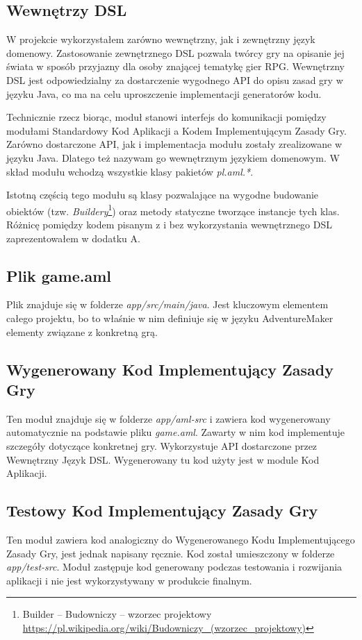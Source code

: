 \documentclass[openright]{xmgr}
\begin{document}
\subsection*{Wewnętrzy DSL}

W projekcie wykorzystałem zarówno wewnętrzny, jak i zewnętrzny język domenowy. Zastosowanie zewnętrznego DSL pozwala twórcy gry na opisanie jej świata w sposób przyjazny dla osoby znającej tematykę gier RPG.  Wewnętrzny DSL jest odpowiedzialny za dostarczenie wygodnego API do opisu zasad gry w języku Java, co ma na celu uproszczenie implementacji generatorów kodu.

Technicznie rzecz biorąc, moduł stanowi interfejs do komunikacji pomiędzy modułami Standardowy Kod Aplikacji a Kodem Implementującym Zasady Gry. Zarówno dostarczone API, jak i implementacja modułu zostały zrealizowane w języku Java. Dlatego też nazywam go wewnętrznym językiem domenowym. W skład modułu wchodzą wszystkie klasy pakietów \textit{pl.aml.*}.

Istotną częścią tego modułu są klasy pozwalające na wygodne budowanie obiektów (tzw. \textit{Buildery}\footnote{Builder -- Budowniczy  -- wzorzec projektowy  \url{https://pl.wikipedia.org/wiki/Budowniczy_(wzorzec_projektowy)}}) oraz metody statyczne tworzące instancje tych klas. Różnicę pomiędzy kodem pisanym z i bez wykorzystania wewnętrznego DSL zaprezentowałem w dodatku A.

\subsection*{Plik game.aml}
Plik znajduje się w folderze \textit{app/src/main/java}. Jest kluczowym elementem całego projektu, bo to właśnie w nim definiuje się w języku AdventureMaker elementy związane z konkretną grą.

\subsection*{Wygenerowany Kod Implementujący Zasady Gry}
Ten moduł znajduje się w folderze \textit{app/aml-src} i zawiera kod wygenerowany automatycznie na podstawie pliku \textit{game.aml}. Zawarty w nim kod implementuje szczegóły dotyczące konkretnej gry. Wykorzystuje API dostarczone przez Wewnętrzny Język DSL. Wygenerowany tu kod użyty jest w module Kod Aplikacji.

\subsection*{Testowy Kod Implementujący Zasady Gry}
Ten moduł zawiera kod analogiczny do Wygenerowanego Kodu Implementującego Zasady Gry, jest jednak napisany ręcznie. Kod został umieszczony w folderze \textit{app/test-src}. Moduł zastępuje kod generowany podczas testowania i rozwijania aplikacji i nie jest wykorzystywany w produkcie finalnym.
\end{document}
